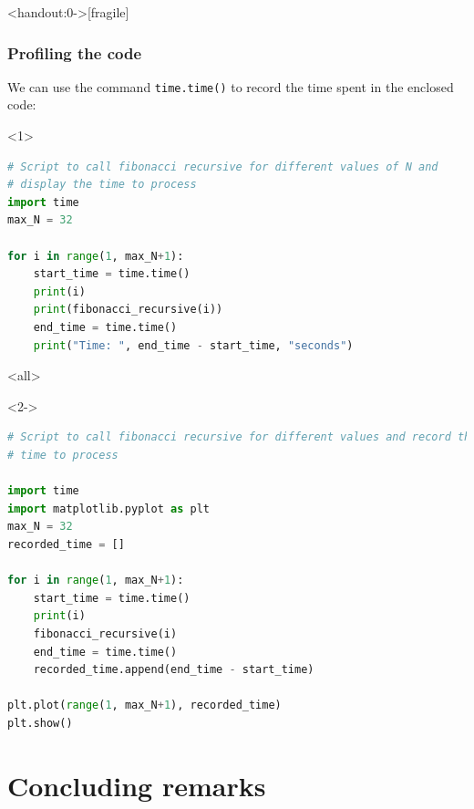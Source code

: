 \begin{frame}<handout:0->[fragile]
  \frametitle{Profiling the code}
  We can use the command \lstinline$time.time()$ to record the time spent in the enclosed code:
    \begin{onlyenv}<1>
      \lstset{showlines=true}
    \begin{lstlisting}[language=Python]
# Script to call fibonacci recursive for different values of N and 
# display the time to process
import time 
max_N = 32

for i in range(1, max_N+1):
    start_time = time.time()
    print(i)
    print(fibonacci_recursive(i))
    end_time = time.time()
    print("Time: ", end_time - start_time, "seconds")
\end{lstlisting}
  \end{onlyenv}
  \mode<all>
  \begin{onlyenv}<2->
    \begin{lstlisting}[language=Python,basicstyle=\scriptsize]
# Script to call fibonacci recursive for different values and record the
# time to process

import time
import matplotlib.pyplot as plt
max_N = 32
recorded_time = []

for i in range(1, max_N+1):
    start_time = time.time()
    print(i)
    fibonacci_recursive(i)
    end_time = time.time()
    recorded_time.append(end_time - start_time)

plt.plot(range(1, max_N+1), recorded_time)
plt.show()
        \end{lstlisting}
      \end{onlyenv}
\end{frame}


\section{Concluding remarks}
